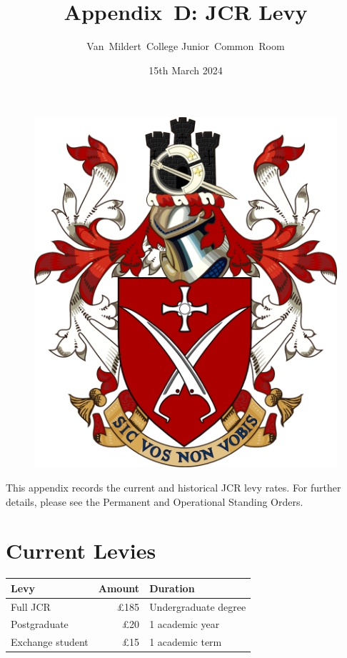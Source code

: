 \documentclass[12pt]{article}
\title{Appendix~D: JCR Levy}
\author{Van~Mildert~College Junior~Common~Room}
\date{15th March 2024}
\begin{document}
\begin{titlepage}  %
    \maketitle
    \begin{figure}[h]
        \includegraphics[scale=0.25]{arms}  %
        \centering
    \end{figure}
    \thispagestyle{empty}
\end{titlepage}
\setcounter{page}{2}  %
This appendix records the current and historical JCR levy rates.
For further details, please see the Permanent and Operational Standing Orders.

\section{Current Levies}
\begin{center}
\begin{tabular}{|l|r|l|}\hline
    \textbf{Levy} & \textbf{Amount} & \textbf{Duration} \\\hline
    Full JCR & £185 & Undergraduate degree \\
    Postgraduate &  £20 & 1 academic year \\
    Exchange student & £15 & 1 academic term\\
    \hline
\end{tabular}
\end{center}
\end{document}
